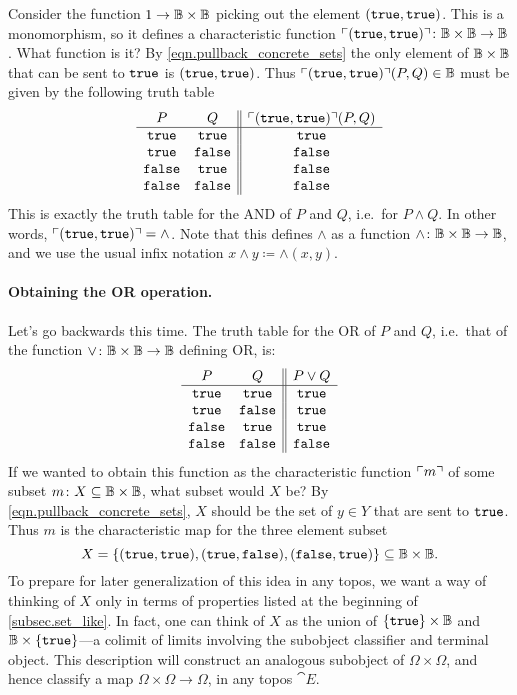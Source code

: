 \documentclass[7Sketches]{subfiles}
\begin{document}
Consider the function $1\to\mathbb{B}\times\mathbb{B}$ picking out the element $(\mathtt{true},\mathtt{true})$. This is a monomorphism, so it defines a characteristic function $\ulcorner(\mathtt{true},\mathtt{true})\urcorner\colon\mathbb{B}\times\mathbb{B}\to\mathbb{B}$. What function is it? By \cref{eqn.pullback_concrete_sets} the only element of $\mathbb{B}\times\mathbb{B}$ that can be sent to $\mathtt{true}$ is $(\mathtt{true},\mathtt{true})$. Thus $\ulcorner(\mathtt{true},\mathtt{true})\urcorner(P,Q)\in\mathbb{B}$ must be given by the following truth table
\[
\begin{array}{cc||c}
	P&Q&\ulcorner(\mathtt{true},\mathtt{true})\urcorner(P,Q)\\\hline
	\mathtt{true}&\mathtt{true}&\mathtt{true}\\
	\mathtt{true}&\mathtt{false}&\mathtt{false}\\
	\mathtt{false}&\mathtt{true}&\mathtt{false}\\
	\mathtt{false}&\mathtt{false}&\mathtt{false}
\end{array}
\]
This is exactly the truth table for the AND of $P$ and $Q$, i.e.\ for $P\wedge Q$. In
other words, $\ulcorner(\mathtt{true},\mathtt{true})\urcorner=\wedge$. Note that this defines $\wedge$
as a function $\wedge\colon \mathbb{B} \times \mathbb{B} \to \mathbb{B}$, and we use the usual
infix notation $x \wedge y\coloneqq \wedge(x,y)$.%

\paragraph{Obtaining the OR operation.}%
Let's go backwards this time. The truth table for the OR of $P$ and $Q$, i.e.\ that of the function $\vee\colon\mathbb{B}\times\mathbb{B}\to\mathbb{B}$ defining OR, is:
\begin{equation}%
\label{eqn.function_vee}
\begin{array}{cc||c}
	P&Q&P\vee Q\\\hline
	\true&\true&\true\\
	\true&\false&\true\\
	\false&\true&\true\\
	\false&\false&\false
\end{array}
\end{equation}
If we wanted to obtain this function as the characteristic function
$\ulcorner m\urcorner$ of some subset $m\colon X\subseteq\mathbb{B}\times\mathbb{B}$, what subset would $X$
be? By \cref{eqn.pullback_concrete_sets}, $X$ should be the set of $y\in Y$ that
are sent to $\mathtt{true}$. Thus $m$ is the characteristic map for the three element
subset \[X=\{(\mathtt{true},\mathtt{true}),(\mathtt{true},\mathtt{false}),(\mathtt{false},\mathtt{true})\}\subseteq\mathbb{B}\times\mathbb{B}.\] To
prepare for later generalization of this idea in any topos, we want a way of thinking of $X$ only in terms of properties
listed at the beginning of \cref{subsec.set_like}. In fact, one can think of $X$
as the union of $\{\mathtt{true}\}\times\mathbb{B}$ and $\mathbb{B}\times\{\mathtt{true}\}$---a colimit of
limits involving the subobject classifier and terminal object. This description will construct
an analogous subobject of $\Omega\times\Omega$, and hence classify a map $\Omega\times\Omega\to\Omega$, in any topos $\cat{E}$.
\end{document}
